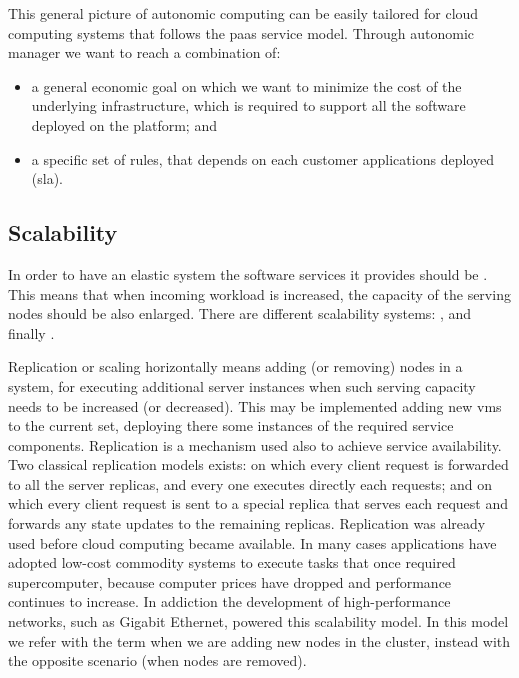 This general picture of autonomic computing can be easily tailored for cloud computing systems that
follows the \ac{paas} service model. Through autonomic manager we want to reach a combination of:

\begin{itemize}
	\item{a general economic goal on which we want to minimize the cost of the underlying infrastructure,
		which is required to support all the software deployed on the platform; and}
	\item{a specific set of rules, that depends on each customer applications deployed (\ac{sla}).}
\end{itemize}

\subsection*{Scalability}
\label{sec:elasticity-requirements-scalability}
In order to have an elastic system the software services it provides should be . This
means that when incoming workload is increased, the capacity of the serving nodes should be also
enlarged. There are different scalability systems: ,  and
finally .

Replication or scaling horizontally means adding (or removing) nodes in a system, for executing additional
server instances when such serving capacity needs to be increased (or decreased). This may be implemented
adding new \ac{vm}s to the current set, deploying there some instances of the required service components.
Replication is a mechanism used also to achieve service availability. Two classical replication models
exists:  on which every client request is forwarded to all the server replicas,
and every one executes directly each requests; and  on which every client request
is sent to a special replica that serves each request and forwards any state updates to the remaining replicas.
Replication was already used before cloud computing became available. In many cases applications have adopted
low-cost commodity systems to execute tasks that once required supercomputer, because computer prices have
dropped and performance continues to increase. In addiction the development of high-performance networks,
such as Gigabit Ethernet, powered this scalability model. In this model we refer with the term
 when we are adding new nodes in the cluster, instead with  the opposite
scenario (when nodes are removed).

